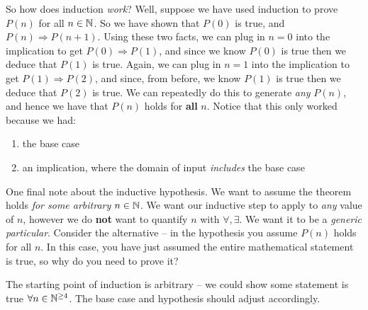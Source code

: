 \documentclass[main.tex]{subfiles}
\begin{document}
So how does induction \textit{work}? Well, suppose we have used induction to prove \(P(n)\) for all \(n \in \mathbb{N}\). So we have shown that \(P(0)\) is true, and \(P(n) \Rightarrow P(n+1)\). Using these two facts, we can plug in \(n=0\) into the implication to get \(P(0) \Rightarrow P(1)\), and since we know \(P(0)\) is true then we deduce that \(P(1)\) is true. Again, we can plug in \(n=1\) into the implication to get \(P(1) \Rightarrow P(2)\), and since, from before, we know \(P(1)\) is true then we deduce that \(P(2)\) is true. We can repeatedly do this to generate \textit{any} \(P(n)\), and hence we have that \(P(n)\) holds for \textbf{all} \(n\). Notice that this only worked because we had:
\begin{enumerate}
	\item the base case
	\item an implication, where the domain of input \textit{includes} the base case
\end{enumerate}

One final note about the inductive hypothesis. We want to assume the theorem holds \textit{for some arbitrary} \(n \in \mathbb{N}\). We want our inductive step to apply to \textit{any} value of \(n\), however we do \textbf{not} want to quantify \(n\) with \(\forall, \exists\). We want it to be a \textit{generic particular}. Consider the alternative -- in the hypothesis you assume \(P(n)\) holds for all \(n\). In this case, you have just assumed the entire mathematical statement is true, so why do you need to prove it?

The starting point of induction is arbitrary -- we could show some statement is true \(\forall n \in \mathbb{N}^{\geq 4}\). The base case and hypothesis should adjust accordingly.

\end{document}
